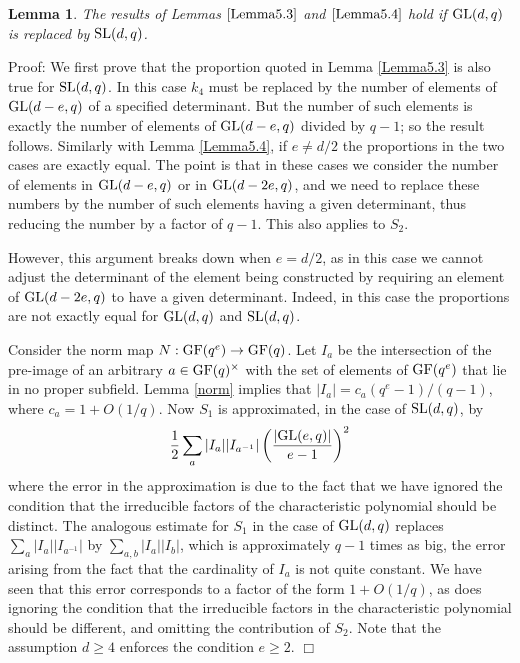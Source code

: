 \documentclass[12pt]{article}
\newtheorem{lemma}[definition]{Lemma}
\newenvironment{proof}{\normalsize {\sc Proof}:}{{\hfill $\Box$ \\}}
\def\SL{{\rm SL}}
\def\GL{{\rm GL}}
\def\GF{{\rm GF}}
\begin{document}
\begin{lemma}\label{Lemma5.5} The results of 
Lemmas $\ref{Lemma5.3}$ and $\ref{Lemma5.4}$ hold 
if $\GL(d,q)$ is replaced by $\SL(d,q)$. 
\end{lemma}
\begin{proof}
We first prove that the proportion quoted in 
Lemma \ref{Lemma5.3} is also true for 
$\SL(d,q)$.  In this case $k_4$ must be replaced by
the number of elements of $\GL(d-e,q)$ of a specified determinant.
But the number of such elements is exactly the number of elements of
$\GL(d-e,q)$ divided by $q-1$; so the result follows.  Similarly with
Lemma \ref{Lemma5.4}, if $e\ne d/2$ the proportions in the two cases are exactly
equal.  The point is that in these cases we consider the number of
elements in $\GL(d-e,q)$ or in $\GL(d-2e,q)$, and we need to replace
these numbers by the number of such elements having a given determinant, thus
reducing the number by a factor of $q-1$.
This also applies to $S_2$.  

However, this argument breaks down when
$e=d/2$, as in this case we cannot adjust the determinant of the
element being constructed by requiring an element of $\GL(d-2e,q)$
to have a given determinant.  
Indeed, in this case the proportions are 
not exactly equal for $\GL(d,q)$ and $\SL(d,q)$.

Consider the norm map $N:\GF(q^e)\to\GF(q)$.  
Let $I_a$ be the intersection of the pre-image of an arbitrary
$a \in \GF(q)^\times$ with the set of elements of $\GF(q^e)$
that lie in no proper subfield.  
Lemma \ref{norm} implies that 
$\vert I_a\vert=c_a (q^e-1) / (q-1)$, where $c_a=1+O(1/q)$.
Now $S_1$ is approximated, in the case of $\SL(d,q)$, by 
$${1\over2}\sum_a\vert I_a\vert\vert 
I_{a^{-1}}\vert\left({\vert\GL(e,q)\vert\over e-1} \right)^2$$
where the error in the approximation is due to the fact that we have 
ignored the condition that the irreducible factors of the characteristic 
polynomial should be
distinct.  The analogous estimate for $S_1$ in the case of $\GL(d,q)$ replaces
$\sum_a\vert I_a\vert \vert I_{a^{-1}}\vert$ by $\sum_{a,b}\vert I_a\vert\vert I_b\vert$,
which is approximately $q-1$ times as big, the error arising from the fact that
the cardinality of $I_a$ is not quite constant.  We have seen that this error 
corresponds to a factor of the form $1+O(1/q)$, as does ignoring the condition
that the irreducible factors in the characteristic polynomial should be 
different,
and omitting the contribution of $S_2$.  
Note that the assumption $d\ge 4$ enforces
the condition $e\ge 2$.
\end{proof}
\end{document}
